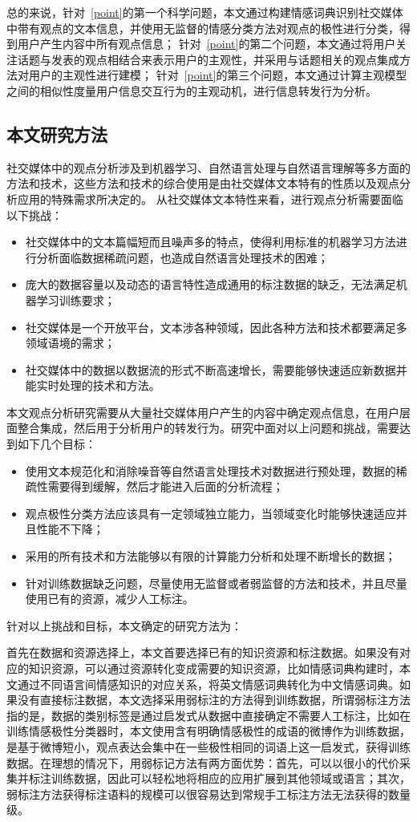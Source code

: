 总的来说，针对~\ref{point}的第一个科学问题，本文通过构建情感词典识别社交媒体中带有观点的文本信息，并使用无监督的情感分类方法对观点的极性进行分类，得到用户产生内容中所有观点信息；
针对~\ref{point}的第二个问题，本文通过将用户关注话题与发表的观点相结合来表示用户的主观性，并采用与话题相关的观点集成方法对用户的主观性进行建模；
针对~\ref{point}的第三个问题，本文通过计算主观模型之间的相似性度量用户信息交互行为的主观动机，进行信息转发行为分析。

\subsection{本文研究方法}
社交媒体中的观点分析涉及到机器学习、自然语言处理与自然语言理解等多方面的方法和技术，这些方法和技术的综合使用是由社交媒体文本特有的性质以及观点分析应用的特殊需求所决定的。
从社交媒体文本特性来看，进行观点分析需要面临以下挑战：
\begin{itemize}
\item 社交媒体中的文本篇幅短而且噪声多的特点，使得利用标准的机器学习方法进行分析面临数据稀疏问题，也造成自然语言处理技术的困难；
\item 庞大的数据容量以及动态的语言特性造成通用的标注数据的缺乏，无法满足机器学习训练要求；
\item 社交媒体是一个开放平台，文本涉各种领域，因此各种方法和技术都要满足多领域语境的需求；
\item 社交媒体中的数据以数据流的形式不断高速增长，需要能够快速适应新数据并能实时处理的技术和方法。
\end{itemize}

本文观点分析研究需要从大量社交媒体用户产生的内容中确定观点信息，在用户层面整合集成，然后用于分析用户的转发行为。研究中面对以上问题和挑战，需要达到如下几个目标：
\begin{itemize}
\item 使用文本规范化和消除噪音等自然语言处理技术对数据进行预处理，数据的稀疏性需要得到缓解，然后才能进入后面的分析流程；
\item 观点极性分类方法应该具有一定领域独立能力，当领域变化时能够快速适应并且性能不下降；
\item 采用的所有技术和方法能够以有限的计算能力分析和处理不断增长的数据；
\item 针对训练数据缺乏问题，尽量使用无监督或者弱监督的方法和技术，并且尽量使用已有的资源，减少人工标注。
\end{itemize}  

针对以上挑战和目标，本文确定的研究方法为：

首先在数据和资源选择上，本文首要选择已有的知识资源和标注数据。如果没有对应的知识资源，可以通过资源转化变成需要的知识资源，比如情感词典构建时，本文通过不同语言间情感知识的对应关系，将英文情感词典转化为中文情感词典。如果没有直接标注数据，本文选择采用弱标注的方法得到训练数据，所谓弱标注方法指的是，数据的类别标签是通过启发式从数据中直接确定不需要人工标注，比如在训练情感极性分类器时，本文使用含有明确情感极性的成语的微博作为训练数据，是基于微博短小，观点表达会集中在一些极性相同的词语上这一启发式，获得训练数据。在理想的情况下，用弱标记方法有两方面优势：首先，可以以很小的代价采集并标注训练数据，因此可以轻松地将相应的应用扩展到其他领域或语言；其次，弱标注方法获得标注语料的规模可以很容易达到常规手工标注方法无法获得的数量级。

